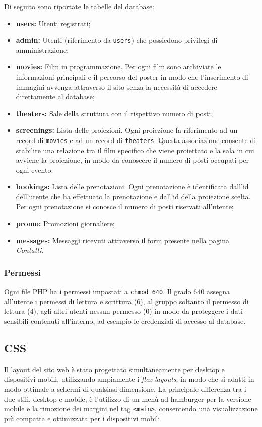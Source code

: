 Di seguito sono riportate le tabelle del database:
\begin{itemize}
    \item \textbf{users:} Utenti registrati;
    \item \textbf{admin:} Utenti (riferimento da \texttt{users}) che possiedono privilegi di amministrazione;
    \item \textbf{movies:} Film in programmazione. Per ogni film sono archiviate le informazioni principali e il percorso del poster in modo che l'inserimento di immagini avvenga attraverso il sito senza la necessità di accedere direttamente al database;
    \item \textbf{theaters:} Sale della struttura con il rispettivo numero di posti;
    \item \textbf{screenings:} Lista delle proiezioni. Ogni proiezione fa riferimento ad un record di \texttt{movies} e ad un record di \texttt{theaters}. Questa associazione consente di stabilire una relazione tra il film specifico che viene proiettato e la sala in cui avviene la proiezione, in modo da conoscere il numero di posti occupati per ogni evento;
    \item \textbf{bookings:} Lista delle prenotazioni. Ogni prenotazione è identificata dall'id\\ dell'utente che ha effettuato la prenotazione e dall'id della proiezione scelta. Per ogni prenotazione si conosce il numero di posti riservati all'utente;
    \item \textbf{promo:} Promozioni giornaliere;
    \item \textbf{messages:} Messaggi ricevuti attraverso il form presente nella pagina \textit{Contatti}.
    
\end{itemize}

\subsubsection{Permessi}
Ogni file PHP ha i permessi impostati a \texttt{chmod 640}.
Il grado 640 assegna all'utente i permessi di lettura e scrittura (6), al gruppo soltanto il permesso di lettura (4), agli altri utenti nessun permesso (0) in modo da proteggere i dati sensibili contenuti all'interno, ad esempio le credenziali di accesso al database.

\subsection{CSS}
Il layout del sito web è stato progettato simultaneamente per desktop e dispositivi mobili, utilizzando ampiamente i \textit{flex layouts}, in modo che si adatti in modo ottimale a schermi di qualsiasi dimensione. La principale differenza tra i due stili, desktop e mobile, è l'utilizzo di un menù ad hamburger per la versione mobile e la rimozione dei margini nel tag \texttt{<main>}, consentendo una visualizzazione più compatta e ottimizzata per i dispositivi mobili.

